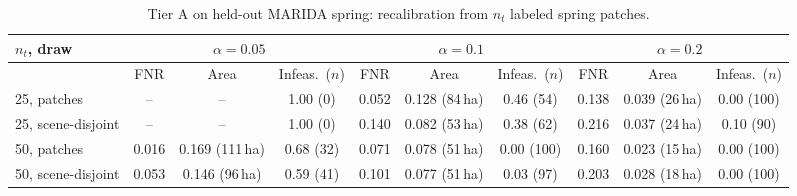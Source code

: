 \begin{table}[t]
\centering
\footnotesize
\setlength{\tabcolsep}{3pt}
\begin{tabular}{lccccccccc}
\toprule
$n_t$, draw & \multicolumn{3}{c}{$\alpha=0.05$} & \multicolumn{3}{c}{$\alpha=0.1$} & \multicolumn{3}{c}{$\alpha=0.2$} \\
\midrule
 & FNR & Area & Infeas.\ ($n$) & FNR & Area & Infeas.\ ($n$) & FNR & Area & Infeas.\ ($n$) \\
\midrule
25, patches & -- & -- & 1.00 (0) & 0.052 & 0.128 (84\,ha) & 0.46 (54) & 0.138 & 0.039 (26\,ha) & 0.00 (100) \\
25, scene-disjoint & -- & -- & 1.00 (0) & 0.140 & 0.082 (53\,ha) & 0.38 (62) & 0.216 & 0.037 (24\,ha) & 0.10 (90) \\
50, patches & 0.016 & 0.169 (111\,ha) & 0.68 (32) & 0.071 & 0.078 (51\,ha) & 0.00 (100) & 0.160 & 0.023 (15\,ha) & 0.00 (100) \\
50, scene-disjoint & 0.053 & 0.146 (96\,ha) & 0.59 (41) & 0.101 & 0.077 (51\,ha) & 0.03 (97) & 0.203 & 0.028 (18\,ha) & 0.00 (100) \\
\bottomrule
\end{tabular}
\caption{Tier A on held-out MARIDA spring: recalibration from $n_t$ labeled spring patches.}
\label{tab:marida_tier_a}
\end{table}
